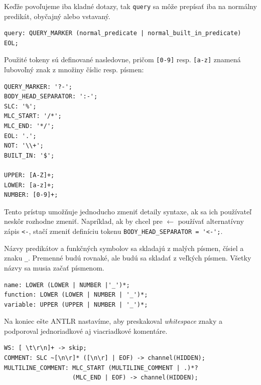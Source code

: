 \vline

Keďže povoľujeme iba kladné dotazy, tak \verb|query| sa môže prepísať iba na normálny predikát,
obyčajný alebo vstavaný.

\begin{verbatim}
query: QUERY_MARKER (normal_predicate | normal_built_in_predicate) EOL;
\end{verbatim}

Použité tokeny sú definované nasledovne, pričom \verb|[0-9]| resp. \verb|[a-z]| znamená ľubovoľný
znak z množiny číslic resp. písmen:

\begin{verbatim}
QUERY_MARKER: '?-';
BODY_HEAD_SEPARATOR: ':-';
SLC: '%';
MLC_START: '/*';
MLC_END: '*/';
EOL: '.';
NOT: '\\+';
BUILT_IN: '$';

UPPER: [A-Z]+;
LOWER: [a-z]+;
NUMBER: [0-9]+;
\end{verbatim}

Tento prístup umožňuje jednoducho zmeniť detaily syntaxe, ak sa ich používateľ neskôr rozhodne
zmeniť. Napríklad, ak by chcel pre $\leftarrow$ používať alternatívny zápis \verb|<-|, stačí zmeniť
definíciu tokenu \verb|BODY_HEAD_SEPARATOR = '<-';|.

\vline

Názvy predikátov a funkčných symbolov sa skladajú z malých písmen, čísiel a znaku \verb|_|. Premenné
budú rovnaké, ale budú sa skladať z veľkých písmen. Všetky názvy sa musia začať písmenom.

\begin{verbatim}
name: LOWER (LOWER | NUMBER |'_')*;
function: LOWER (LOWER | NUMBER | '_')*;
variable: UPPER (UPPER | NUMBER | '_')*;
\end{verbatim}

Na koniec ešte ANTLR nastavíme, aby preskakoval \textit{whitespace} znaky a podporoval
jednoriadkové aj viacriadkové komentáre.

\begin{verbatim}
WS: [ \t\r\n]+ -> skip;
COMMENT: SLC ~[\n\r]* ([\n\r] | EOF) -> channel(HIDDEN);
MULTILINE_COMMENT: MLC_START (MULTILINE_COMMENT | .)*? 
                   (MLC_END | EOF) -> channel(HIDDEN);
\end{verbatim}